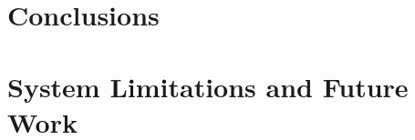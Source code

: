 \cleardoublepage
\label{chap:conclusion1}


\section{Conclusions}




\section{System Limitations and Future Work}
